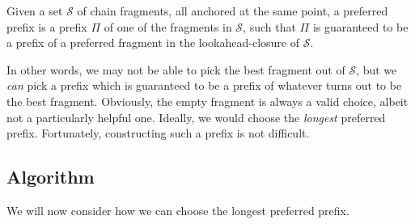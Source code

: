 \begin{definition}
Given a set $\mathcal{S}$ of chain fragments, all anchored at the same point, a
preferred prefix is a prefix $\Pi$ of one of the fragments in $\mathcal{S}$,
such that $\Pi$ is guaranteed to be a prefix of a preferred fragment in the
lookahead-closure of $\mathcal{S}$.
\end{definition}

In other words, we may not be able to pick the best fragment out of
$\mathcal{S}$, but we \emph{can} pick a prefix which is guaranteed to be a
prefix of whatever turns out to be the best fragment. Obviously, the empty
fragment is always a valid choice, albeit not a particularly helpful one.
Ideally, we would choose the \emph{longest} preferred prefix. Fortunately,
constructing such a prefix is not difficult.

\subsection{Algorithm}

We will now consider how we can choose the longest preferred prefix.

